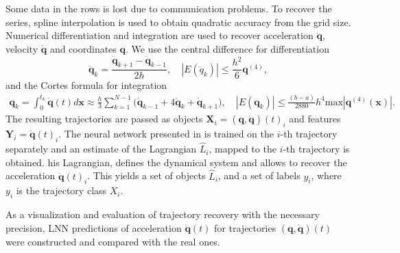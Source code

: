 \documentclass[sn-mathphys-num]{sn-jnl}
\theoremstyle{thmstylethree}
\theoremstyle{thmstyletwo}
\theoremstyle{thmstyleone}
\begin{document}
Some data in the rows is lost due to communication problems. To recover the series, spline interpolation is used to obtain quadratic accuracy from the grid size. Numerical differentiation and integration are used to recover acceleration $\ddot{\mathbf{q}}$, velocity $\dot{\mathbf{q}}$ and coordinates $\mathbf{q}$. We use the central difference for differentiation
\[
\ddot{\mathbf{q}}_k =\frac{\dot{\mathbf{q}}_{k+1} - \dot{\mathbf{q}}_{k-1}}{2h},
\quad
\left|E(\ddot{q}_k)\right|\le \frac{h^2}{6}\mathbf{q}^{(4)},
\]
and the Cortes formula for integration 
\[
\begin{split}
\mathbf{q}_k = \int_{0}^{t_k}{\dot{\mathbf{q}}(t)d\mathbf{x}}\approx\frac{h}{3}\sum_{k=1}^{N-1}{\Big(\dot{\mathbf{q}}_{k-1}+4\dot{\mathbf{q}}_k+\dot{\mathbf{q}}_{k+1}\Big)},
\quad
\left|E(\mathbf{q}_k)\right| \le \frac{(b-a)}{2880}h^4\text{max}\left|\mathbf{q}^{(4)}\left(\mathbf{x}\right)\right|.
\end{split}
\]
The resulting trajectories are passed as objects $\mathbf{X}_i = (\mathbf{q},\dot{\mathbf{q}})(t)_i$ and features $\mathbf{Y}_i = \ddot{\mathbf{q}}(t)_i$. The neural network presented in \cite{article} is trained on the $i$-th trajectory separately and an estimate of the Lagrangian $\hat{L}_i$, mapped to the $i$-th trajectory is obtained. his Lagrangian, defines the dynamical system and allows to recover the acceleration $\ddot{\mathbf{q}}(t)_i$. This yields a set of objects $\hat{L}_i$, and a set of labels $y_i$, where $y_i$ is the trajectory class $X_i$.


As a visualization and evaluation of trajectory recovery with the necessary precision, LNN predictions of acceleration $\ddot{\mathbf{q}}(t)$ for trajectories $(\mathbf{q}, \dot{\mathbf{q}})(t)$ were constructed
and compared with the real ones.
\end{document}
